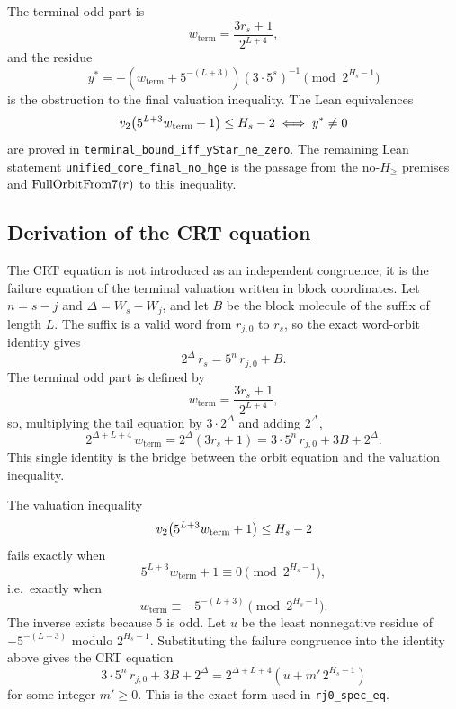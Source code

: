 The terminal odd part is
\begin{equation*}
  w_{\mathrm{term}}=\frac{3r_s+1}{2^{L+4}},
\end{equation*}
and the residue
\begin{equation*}
  y^*=
  -\left(w_{\mathrm{term}}+5^{-(L+3)}\right)
  \left(3\cdot5^s\right)^{-1}
  \pmod{2^{H_s-1}}
\end{equation*}
is the obstruction to the final valuation inequality.  The Lean
equivalences
\begin{equation*}
  v_2\!\left(5^{L+3}w_{\mathrm{term}}+1\right)\le H_s-2
  \iff y^*\ne0
\end{equation*}
are proved in
\texttt{terminal\_bound\_iff\_yStar\_ne\_zero}.  The remaining Lean
statement \texttt{unified\_core\_final\_no\_hge} is the passage from
the no-$H_{\ge}$ premises and $\mathrm{FullOrbitFrom7}(r)$ to this inequality.

\subsection{Derivation of the CRT equation}

The CRT equation is not introduced as an independent congruence; it is
the failure equation of the terminal valuation written in block
coordinates.  Let $n=s-j$ and $\Delta=W_s-W_j$, and let $B$ be the
block molecule of the suffix of length $L$.  The suffix is a valid
word from $r_{j,0}$ to $r_s$, so the exact word-orbit identity gives
\begin{equation*}
  2^{\Delta}\,r_s=5^n\,r_{j,0}+B.
\end{equation*}
The terminal odd part is defined by
\begin{equation*}
  w_{\mathrm{term}}=\frac{3r_s+1}{2^{L+4}},
\end{equation*}
so, multiplying the tail equation by $3\cdot2^{\Delta}$ and adding
$2^{\Delta}$,
\begin{equation*}
  2^{\Delta+L+4}\,w_{\mathrm{term}}
    =2^{\Delta}(3r_s+1)
    =3\cdot5^n\,r_{j,0}+3B+2^{\Delta}.
\end{equation*}
This single identity is the bridge between the orbit equation and the
valuation inequality.

The valuation inequality
\begin{equation*}
  v_2\!\left(5^{L+3}w_{\mathrm{term}}+1\right)\le H_s-2
\end{equation*}
fails exactly when
\begin{equation*}
  5^{L+3}w_{\mathrm{term}}+1\equiv0\pmod{2^{H_s-1}},
\end{equation*}
i.e.\ exactly when
\begin{equation*}
  w_{\mathrm{term}}\equiv-5^{-(L+3)}
  \pmod{2^{H_s-1}}.
\end{equation*}
The inverse exists because $5$ is odd.  Let $u$ be the least
nonnegative residue of $-5^{-(L+3)}$ modulo $2^{H_s-1}$.  Substituting
the failure congruence into the identity above gives the CRT equation
\begin{equation*}
  3\cdot5^n\,r_{j,0}+3B+2^{\Delta}
    =2^{\Delta+L+4}\left(u+m'\,2^{H_s-1}\right)
\end{equation*}
for some integer $m'\ge0$.  This is the exact form used in
\texttt{rj0\_\allowbreak spec\_\allowbreak eq}.

